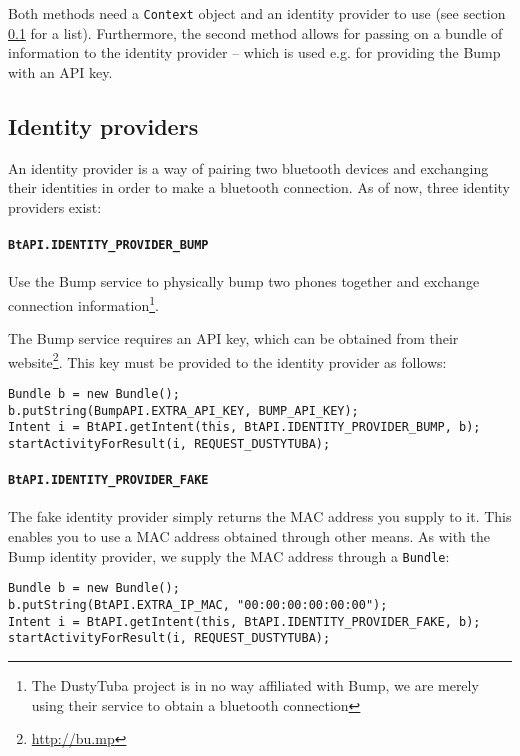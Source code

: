 \documentclass[a4paper,11pt]{article}
\begin{document}
Both methods need a \verb+Context+ object and an identity provider to use (see section \ref{identity-providers} for a list). Furthermore, the second method allows for passing on a bundle of information to the identity provider -- which is used e.g. for providing the Bump\texttrademark{} with an API key.

\subsection{Identity providers}
\label{identity-providers}
An identity provider is a way of pairing two bluetooth devices and exchanging their identities in order to make a bluetooth connection. As of now, three identity providers exist:

\paragraph{{\tt BtAPI.IDENTITY\_PROVIDER\_BUMP}}
Use the Bump\texttrademark{} service to physically bump two phones together and exchange connection information\footnote{The DustyTuba project is in no way affiliated with Bump\texttrademark, we are merely using their service to obtain a bluetooth connection}.

The Bump\texttrademark{} service requires an API key, which can be obtained from their website\footnote{\url{http://bu.mp}}. This key must be provided to the identity provider as follows:

\footnotesize
\begin{verbatim}
Bundle b = new Bundle();
b.putString(BumpAPI.EXTRA_API_KEY, BUMP_API_KEY);
Intent i = BtAPI.getIntent(this, BtAPI.IDENTITY_PROVIDER_BUMP, b);
startActivityForResult(i, REQUEST_DUSTYTUBA);
\end{verbatim}
\normalsize

\paragraph{{\tt BtAPI.IDENTITY\_PROVIDER\_FAKE}}
The fake identity provider simply returns the MAC address you supply to it. This enables you to use a MAC address obtained through other means. As with the Bump\texttrademark{} identity provider, we supply the MAC address through a \verb+Bundle+:

\footnotesize
\begin{verbatim}
Bundle b = new Bundle();
b.putString(BtAPI.EXTRA_IP_MAC, "00:00:00:00:00:00");
Intent i = BtAPI.getIntent(this, BtAPI.IDENTITY_PROVIDER_FAKE, b);
startActivityForResult(i, REQUEST_DUSTYTUBA);
\end{verbatim}
\normalsize
\end{document}
